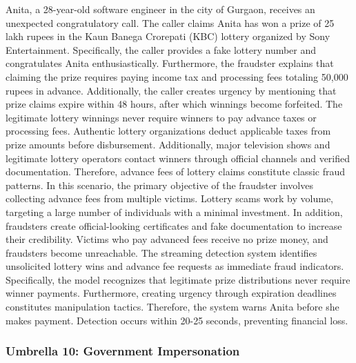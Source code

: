 \documentclass{article}
\begin{document}
Anita, a 28-year-old software engineer in the city of Gurgaon, receives an unexpected congratulatory call. The caller claims Anita has won a prize of 25 lakh rupees in the Kaun Banega Crorepati (KBC) lottery organized by Sony Entertainment. Specifically, the caller provides a fake lottery number and congratulates Anita enthusiastically. Furthermore, the fraudster explains that claiming the prize requires paying income tax and processing fees totaling 50,000 rupees in advance. Additionally, the caller creates urgency by mentioning that prize claims expire within 48 hours, after which winnings become forfeited. The legitimate lottery winnings never require winners to pay advance taxes or processing fees. Authentic lottery organizations deduct applicable taxes from prize amounts before disbursement. Additionally, major television shows and legitimate lottery operators contact winners through official channels and verified documentation. Therefore, advance fees of lottery claims constitute classic fraud patterns. In this scenario, the primary objective of the fraudster involves collecting advance fees from multiple victims. Lottery scams work by volume, targeting a large number of individuals with a minimal investment. In addition, fraudsters create official-looking certificates and fake documentation to increase their credibility. Victims who pay advanced fees receive no prize money, and fraudsters become unreachable. The streaming detection system identifies unsolicited lottery wins and advance fee requests as immediate fraud indicators. Specifically, the model recognizes that legitimate prize distributions never require winner payments. Furthermore, creating urgency through expiration deadlines constitutes manipulation tactics. Therefore, the system warns Anita before she makes payment. Detection occurs within 20-25 seconds, preventing financial loss.

\subsubsection{Umbrella 10: Government Impersonation}
\label{app:casestudy:government}
\end{document}
